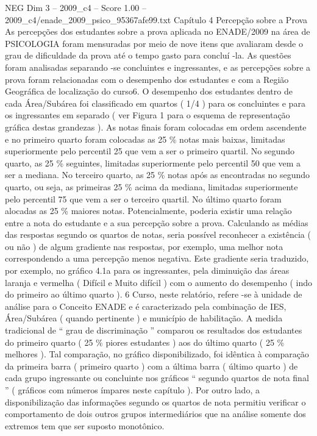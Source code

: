 \begin{textsample}{NEG Dim 3 – 2009\_c4 – Score 1.00 – 2009\_c4/enade\_2009\_psico\_95367afe99.txt}  \label{ex:f3_neg_161}
Capítulo 4 Percepção sobre a Prova As percepções dos estudantes sobre a prova aplicada no ENADE/2009 na área de PSICOLOGIA foram mensuradas por meio de nove itens que avaliaram desde o grau de dificuldade da prova até o tempo gasto para concluí -la.
As questões foram analisadas separando -se concluintes e ingressantes, e as percepções sobre a prova foram relacionadas com o desempenho dos estudantes e com a Região Geográfica de localização do curso6.
O desempenho dos estudantes dentro de cada Área/Subárea foi classificado em quartos ( 1/4 ) para os concluintes e para os ingressantes em separado ( ver Figura 1 para o esquema de representação gráfica destas grandezas ).
As notas finais foram colocadas em ordem ascendente e no primeiro quarto foram colocadas as 25 \% notas mais baixas, limitadas superiormente pelo percentil 25 que vem a ser o primeiro quartil.
No segundo quarto, as 25 \% seguintes, limitadas superiormente pelo percentil 50 que vem a ser a mediana.
No terceiro quarto, as 25 \% notas após as encontradas no segundo quarto, ou seja, as primeiras 25 \% acima da mediana, limitadas superiormente pelo percentil 75 que vem a ser o terceiro quartil.
No último quarto foram alocadas as 25 \% maiores notas.
Potencialmente, poderia existir uma relação entre a nota do estudante e a sua percepção sobre a prova.
Calculando as médias das respostas segundo os quartos de notas, seria possível reconhecer a existência ( ou não ) de algum gradiente nas respostas, por exemplo, uma melhor nota correspondendo a uma percepção menos negativa.
Este gradiente seria traduzido, por exemplo, no gráfico 4.1a para os ingressantes, pela diminuição das áreas laranja e vermelha ( Difícil e Muito difícil ) com o aumento do desempenho ( indo do primeiro ao último quarto ). 6 Curso, neste relatório, refere -se à unidade de análise para o Conceito ENADE e é caracterizado pela combinação de IES, Área/Subárea ( quando pertinente ) e município de habilitação.
A medida tradicional de “ grau de discriminação ” comparou os resultados dos estudantes do primeiro quarto ( 25 \% piores estudantes ) aos do último quarto ( 25 \% melhores ).
Tal comparação, no gráfico disponibilizado, foi idêntica à comparação da primeira barra ( primeiro quarto ) com a última barra ( último quarto ) de cada grupo ingressante ou concluinte nos gráficos “ segundo quartos de nota final ” ( gráficos com números ímpares neste capítulo ).
Por outro lado, a disponibilização das informações segundo os quartos de nota permitiu verificar o comportamento de dois outros grupos intermediários que na análise somente dos extremos tem que ser suposto monotônico.

\end{textsample}
